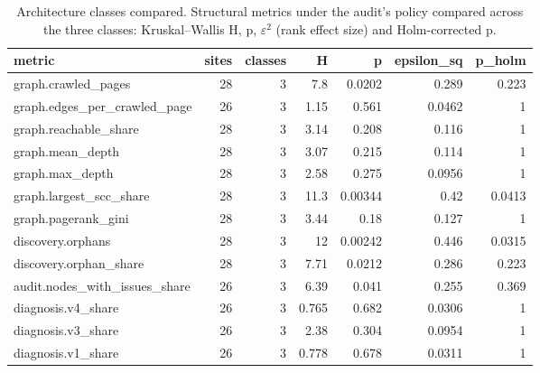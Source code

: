 \begin{table}[t]
\centering
\small
\caption{Architecture classes compared. Structural metrics under the audit's policy compared across the three classes: Kruskal--Wallis H, p, $\varepsilon$$^2$ (rank effect size) and Holm-corrected p.}
\label{tab:t0_corpus_classes}
\begin{tabular}{lrrrrrr}
\toprule
metric & sites & classes & H & p & epsilon\_sq & p\_holm \\
\midrule
graph.crawled\_pages & 28 & 3 & 7.8 & 0.0202 & 0.289 & 0.223 \\
graph.edges\_per\_crawled\_page & 26 & 3 & 1.15 & 0.561 & 0.0462 & 1 \\
graph.reachable\_share & 28 & 3 & 3.14 & 0.208 & 0.116 & 1 \\
graph.mean\_depth & 28 & 3 & 3.07 & 0.215 & 0.114 & 1 \\
graph.max\_depth & 28 & 3 & 2.58 & 0.275 & 0.0956 & 1 \\
graph.largest\_scc\_share & 28 & 3 & 11.3 & 0.00344 & 0.42 & 0.0413 \\
graph.pagerank\_gini & 28 & 3 & 3.44 & 0.18 & 0.127 & 1 \\
discovery.orphans & 28 & 3 & 12 & 0.00242 & 0.446 & 0.0315 \\
discovery.orphan\_share & 28 & 3 & 7.71 & 0.0212 & 0.286 & 0.223 \\
audit.nodes\_with\_issues\_share & 26 & 3 & 6.39 & 0.041 & 0.255 & 0.369 \\
diagnosis.v4\_share & 26 & 3 & 0.765 & 0.682 & 0.0306 & 1 \\
diagnosis.v3\_share & 26 & 3 & 2.38 & 0.304 & 0.0954 & 1 \\
diagnosis.v1\_share & 26 & 3 & 0.778 & 0.678 & 0.0311 & 1 \\
\bottomrule
\end{tabular}
\end{table}
